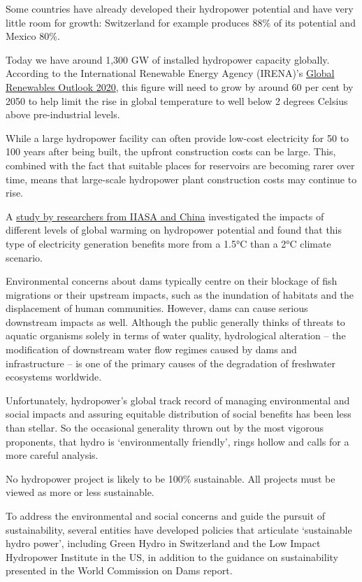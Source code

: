 \documentclass[
]{book}
\begin{document}
Some countries have already developed their hydropower potential and have very little room for growth: Switzerland for example produces 88\% of its potential and Mexico 80\%.

Today we have around 1,300 GW of installed hydropower capacity globally. According to the International Renewable Energy Agency (IRENA)'s \href{https://www.irena.org/-/media/Files/IRENA/Agency/Publication/2020/Apr/IRENA_Global_Renewables_Outlook_2020.pdf}{Global Renewables Outlook 2020}, this figure will need to grow by around 60 per cent by 2050 to help limit the rise in global temperature to well below 2 degrees Celsius above pre-industrial levels.

While a large hydropower facility can often provide low-cost electricity for 50 to 100 years after being built, the upfront construction costs can be large. This, combined with the fact that suitable places for reservoirs are becoming rarer over time, means that large-scale hydropower plant construction costs may continue to rise.

A \href{https://phys.org/news/2020-05-exploring-impacts-climate-hydropower-production.html}{study by researchers from IIASA and China} investigated the impacts of different levels of global warming on hydropower potential and found that this type of electricity generation benefits more from a 1.5°C than a 2°C climate scenario.

Environmental concerns about dams typically centre on their blockage of fish migrations or their upstream impacts, such as the inundation of habitats and the displacement of human communities. However, dams can cause serious downstream impacts as well. Although the public generally thinks of threats to aquatic organisms solely in terms of water quality, hydrological alteration -- the modification of downstream water flow regimes caused by dams and infrastructure -- is one of the primary causes of the degradation of freshwater ecosystems worldwide.

Unfortunately, hydropower's global track record of managing environmental and social impacts and assuring equitable distribution of social benefits has been less than stellar. So the occasional generality thrown out by the most vigorous proponents, that hydro is `environmentally friendly', rings hollow and calls for a more careful analysis.

No hydropower project is likely to be 100\% sustainable. All projects must be viewed as more or less sustainable.

To address the environmental and social concerns and guide the pursuit of sustainability, several entities have developed policies that articulate `sustainable hydro power', including Green Hydro in Switzerland and the Low Impact Hydropower Institute in the US, in addition to the guidance on sustainability presented in the World Commission on Dams report.
\end{document}
